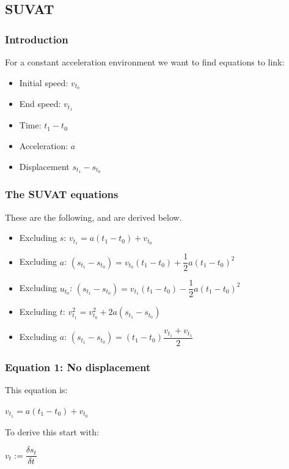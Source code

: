 
\subsection{SUVAT}

\subsubsection{Introduction}

For a constant acceleration environment we want to find equations to link:
\begin{itemize}
\item Initial speed: \(v_{t_0}\)
\item End speed: \(v_{t_1}\)
\item Time: \(t_1-t_0\)
\item Acceleration: \(a\)
\item Displacement \(s_{t_1}-s_{t_0}\)
\end{itemize}

\subsubsection{The SUVAT equations}

These are the following, and are derived below.

\begin{itemize}
\item Excluding \(s\): \(v_{t_1}=a(t_1-t_0)+v_{t_0}\)
\item Excluding \(a\): \((s_{t_1}-s_{t_0})=v_{t_0}(t_1-t_0)+\dfrac{1}{2}a(t_1-t_0)^2\)
\item Excluding \(u_{t_0}\): \((s_{t_1}-s_{t_0})=v_{t_1}(t_1-t_0)-\dfrac{1}{2}a(t_1-t_0)^2\)
\item Excluding \(t\): \(v_{t_1}^2= v_{t_0}^2+2a(s_{t_1}-s_{t_0})\)
\item Excluding \(a\): \((s_{t_1}-s_{t_0})=(t_1-t_0)\dfrac{v_{t_1}+v_{t_1}}{2}\)
\end{itemize}

\subsubsection{Equation 1: No displacement}

This equation is:

\(v_{t_1}=a(t_1-t_0)+v_{t_0}\)

To derive this start with:

\(v_t:=\dfrac{\delta s_t}{\delta t}\)


